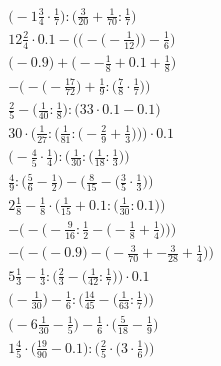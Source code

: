 \documentclass[8pt]{article}
\begin{document}
\begin{align}
\big(-1\frac{3}{4} \cdot \frac{1}{7}\big) : \big(\frac{3}{20} + \frac{1}{70} : \frac{1}{7}\big) \\
12\frac{2}{4} \cdot 0.1 - \bigg(\Big(-\big(-\frac{1}{12}\big)\Big) - \frac{1}{6}\bigg) \\
\big(-0.9\big) + \big(--\frac{1}{8} + 0.1 + \frac{1}{8}\big) \\
-\Big(-\big(-\frac{17}{72}\big) + \frac{1}{9} : \big(\frac{7}{8} \cdot \frac{1}{7}\big)\Big) \\
\frac{2}{5} - \big(\frac{1}{40} : \frac{1}{8}\big) : \big(33 \cdot 0.1 - 0.1\big) \\
30 \cdot \bigg(\frac{1}{27} : \Big(\frac{1}{81} : \big(-\frac{2}{9} + \frac{1}{3}\big)\Big)\bigg) \cdot 0.1 \\
\Big(-\frac{4}{5} \cdot \frac{1}{4}\Big) : \Big(\frac{1}{30} : \big(\frac{1}{18} : \frac{1}{3}\big)\Big) \\
\frac{4}{9} : \Big(\frac{5}{6} - \frac{1}{2}\Big) - \Big(\frac{8}{15} - \big(\frac{3}{5} \cdot \frac{1}{3}\big)\Big) \\
2\frac{1}{8} - \frac{1}{8} \cdot \Big(\frac{1}{15} + 0.1 : \big(\frac{1}{30} : 0.1\big)\Big) \\
-\bigg(-\Big(-\frac{9}{16} : \frac{1}{2} - \big(-\frac{1}{8} + \frac{1}{4}\big)\Big)\bigg) \\
-\Big(-\big(-0.9\big) - \big(-\frac{3}{70} + -\frac{3}{28} + \frac{1}{4}\big)\Big) \\
5\frac{1}{3} - \frac{1}{3} : \Big(\frac{2}{3} - \big(\frac{1}{42} : \frac{1}{7}\big)\Big) \cdot 0.1 \\
\Big(-\frac{1}{30}\Big) - \frac{1}{6} : \Big(\frac{14}{45} - \big(\frac{1}{63} : \frac{1}{7}\big)\Big) \\
\big(-6\frac{1}{30} - \frac{1}{5}\big) - \frac{1}{6} \cdot \big(\frac{5}{18} - \frac{1}{9}\big) \\
1\frac{4}{5} \cdot \Big(\frac{19}{90} - 0.1\Big) : \Big(\frac{2}{5} \cdot \big(3 \cdot \frac{1}{6}\big)\Big)
\end{align}
\end{document}
